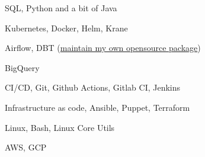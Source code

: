 \item SQL, Python and a bit of Java
\item Kubernetes, Docker, Helm, Krane
\item Airflow, DBT
  (\href{https://github.com/smartlyio/debezium-stg}{maintain my own opensource package})
\item BigQuery
\item CI/CD, Git, Github Actions, Gitlab CI, Jenkins
\item Infrastructure as code, Ansible, Puppet, Terraform
\item Linux, Bash, Linux Core Utils
\item AWS, GCP
